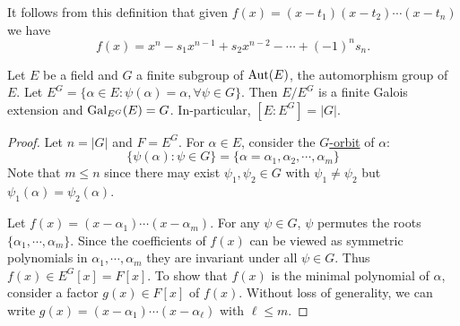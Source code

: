 \documentclass[11pt]{article}
\begin{document}
\begin{remark}
    It follows from this definition that given $f(x)=(x-t_1)(x-t_2)\cdots(x-t_n)$ we have
    \[f(x)=x^n-s_1x^{n-1}+s_2x^{n-2}-\cdots+(-1)^ns_n.\]
\end{remark}

\begin{theorem}[E. Artin]
    Let $E$ be a field and $G$ a finite subgroup of $\operatorname{Aut}(E)$, the automorphism group of $E$. Let $E^G=\{\alpha\in E:\psi(\alpha)=\alpha,\forall\psi\in G\}$. Then $E/E^G$ is a finite Galois extension and $\operatorname{Gal}_{E^G}(E)=G$. In-particular, $[E:E^G]=|G|$.
\end{theorem}

\begin{proof}
    Let $n=|G|$ and $F=E^G$. For $\alpha\in E$, consider the \ul{$G$-orbit} of $\alpha$:
    \[\{\psi(\alpha):\psi\in G\}=\{\alpha=\alpha_1,\alpha_2,\cdots,\alpha_m\}\]
    Note that $m\leq n$ since there may exist $\psi_1,\psi_2\in G$ with $\psi_1\neq\psi_2$ but $\psi_1(\alpha)=\psi_2(\alpha)$.
    
    Let $f(x)=(x-\alpha_1)\cdots(x-\alpha_m)$. For any $\psi\in G$, $\psi$ permutes the roots $\{\alpha_1,\cdots,\alpha_m\}$. Since the coefficients of $f(x)$ can be viewed as symmetric polynomials in $\alpha_1,\cdots,\alpha_m$ they are invariant under all $\psi\in G$. Thus $f(x)\in E^G[x]=F[x]$. To show that $f(x)$ is the minimal polynomial of $\alpha$, consider a factor $g(x)\in F[x]$ of $f(x)$. Without loss of generality, we can write $g(x)=(x-\alpha_1)\cdots(x-\alpha_\ell)$ with $\ell\leq m$.


\end{proof}
\end{document}
